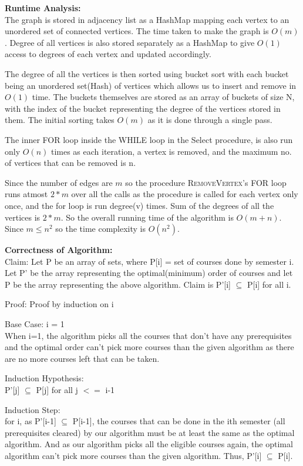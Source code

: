 \documentclass[a4paper]{article}
\begin{document}
\begin{enumerate}[1.]
    
    \textbf{Runtime Analysis:}\\
    The graph is stored in adjacency list as a HashMap mapping each vertex to an unordered set of connected vertices. The time taken to make the graph is $O(m)$.
    Degree of all vertices is also stored separately as a HashMap to give $O(1)$ access to degrees of each vertex and updated accordingly.
    
    The degree of all the vertices is then sorted using bucket sort with each bucket being an unordered set(Hash) of vertices which allows us to insert and remove in  $O(1)$ time. The buckets themselves are stored as an array of buckets of size N, with the index of the bucket representing the degree of the vertices stored in them. The initial sorting takes $O(m)$ as it is done through a single pass.
    
    The inner FOR loop inside the WHILE loop in the Select procedure, is also run only $O(n)$ times as each iteration, a vertex is removed, and the maximum no. of vertices that can be removed is n. 
    
    Since the number of edges are $m$ so the procedure \textsc{RemoveVertex}'s FOR loop runs atmost $2*m$  over all the calls as the procedure is called for each vertex only once, and the for loop is run degree(v) times. Sum of the degrees of all the vertices is $2*m$. So the overall running time of the algorithm is $O(m+n)$.
    Since $m \leq n^2$ so the time complexity is $O(n^2)$.
    
    \textbf{Correctness of Algorithm:}\\
    Claim: Let P be an array of sets, where P[i] = set of courses done by semester i. Let P' be the array representing the optimal(minimum) order of courses and let P be the array representing the above algorithm. Claim is P'[i] $\subseteq$ P[i] for all i.
    
    Proof: Proof by induction on i
    
    Base Case: i = 1\\
    When i=1, the algorithm picks all the courses that don't have any prerequisites and the optimal order can't pick more courses than the given algorithm as there are no more courses left that can be taken.
    
    Induction Hypothesis:\\
    P'[j] $\subseteq$ P[j] for all j $<=$ i-1
    
    Induction Step:\\
    for i, as P'[i-1] $\subseteq$ P[i-1], the courses that can be done in the ith semester (all prerequisites cleared) by our algorithm must be at least the same as the optimal algorithm. And as our algorithm picks all the eligible courses again, the optimal algorithm can't pick more courses than the given algorithm. Thus, P'[i] $\subseteq$ P[i].
    

\end{enumerate}
\end{document}
